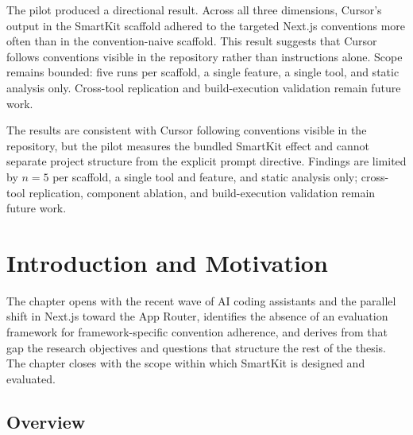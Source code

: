 \documentclass[12pt,a4paper]{report}
\begin{document}
The pilot produced a directional result. Across all three dimensions, Cursor's output in the SmartKit scaffold adhered to the targeted Next.js conventions more often than in the convention-naive scaffold. This result suggests that Cursor follows conventions visible in the repository rather than instructions alone. Scope remains bounded: five runs per scaffold, a single feature, a single tool, and static analysis only. Cross-tool replication and build-execution validation remain future work.

The results are consistent with Cursor following conventions visible in the repository, but the pilot measures the bundled SmartKit effect and cannot separate project structure from the explicit prompt directive. Findings are limited by $n=5$ per scaffold, a single tool and feature, and static analysis only; cross-tool replication, component ablation, and build-execution validation remain future work.

\clearpage

\tableofcontents

\clearpage

\listoffigures
\thispagestyle{preliminary}

\clearpage

\listoftables
\thispagestyle{preliminary}

\clearpage


\pagestyle{fancy}


\chapter{Introduction and Motivation}
\label{sec:introduction}

The chapter opens with the recent wave of AI coding assistants and the parallel shift in Next.js toward the App Router, identifies the absence of an evaluation framework for framework-specific convention adherence, and derives from that gap the research objectives and questions that structure the rest of the thesis. The chapter closes with the scope within which SmartKit is designed and evaluated.

\section{Overview}
\label{sec:overview}
\end{document}
